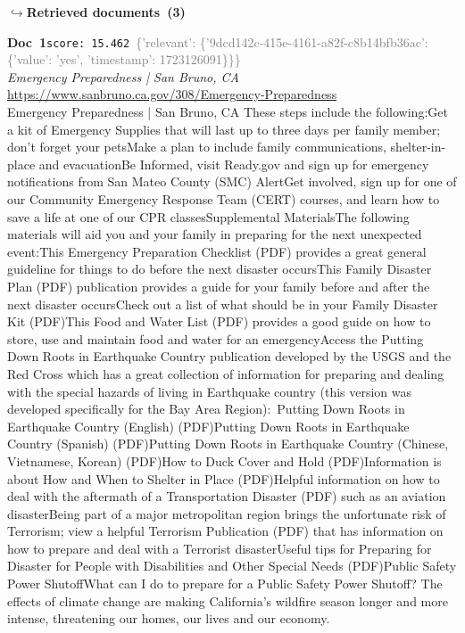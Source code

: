 \documentclass[a4paper,11pt]{article}
\begin{document}
\noindent\hfill{\footnotesize\textcolor{doccolor}{\textbf{$\hookrightarrow$\enspace Retrieved documents~(3)}}}
\begin{docenv}
{\footnotesize\textcolor{doccolor}{\textbf{Doc~1}}}\hfill{\tiny\texttt{score:~15.462}}\ {\tiny\textcolor{gray}{\{'relevant': \{'9dcd142c-415e-4161-a82f-c8b14bfb36ac': \{'value': 'yes', 'timestamp': 1723126091\}\}\}}}\\[3pt]
{\small\textit{Emergency Preparedness | San Bruno, CA}}\\[2pt]
{\tiny\url{https://www.sanbruno.ca.gov/308/Emergency-Preparedness}}\\[4pt]
{\footnotesize Emergency Preparedness | San Bruno, CA
These steps include the following:Get a kit of Emergency Supplies that will last up to three days per family member; don't forget your petsMake a plan to include family communications, shelter-in-place and evacuationBe Informed, visit Ready.gov and sign up for emergency notifications from San Mateo County (SMC) AlertGet involved, sign up for one of our Community Emergency Response Team (CERT) courses, and learn how to save a life at one of our CPR classesSupplemental MaterialsThe following materials will aid you and your family in preparing for the next unexpected event:This Emergency Preparation Checklist (PDF) provides a great general guideline for things to do before the next disaster occursThis Family Disaster Plan (PDF) publication provides a guide for your family before and after the next disaster occursCheck out a list of what should be in your Family Disaster Kit (PDF)This Food and Water List (PDF) provides a good guide on how to store, use and maintain food and water for an emergencyAccess the Putting Down Roots in Earthquake Country publication developed by the USGS and the Red Cross which has a great collection of information for preparing and dealing with the special hazards of living in Earthquake country (this version was developed specifically for the Bay Area Region): Putting Down Roots in Earthquake Country (English) (PDF)Putting Down Roots in Earthquake Country (Spanish) (PDF)Putting Down Roots in Earthquake Country (Chinese, Vietnamese, Korean) (PDF)How to Duck Cover and Hold (PDF)Information is about How and When to Shelter in Place (PDF)Helpful information on how to deal with the aftermath of a Transportation Disaster (PDF) such as an aviation disasterBeing part of a major metropolitan region brings the unfortunate risk of Terrorism; view a helpful Terrorism Publication (PDF) that has information on how to prepare and deal with a Terrorist disasterUseful tips for Preparing for Disaster for People with Disabilities and Other Special Needs (PDF)Public Safety Power ShutoffWhat can I do to prepare for a Public Safety Power Shutoff? The effects of climate change are making California's wildfire season longer and more intense, threatening our homes, our lives and our economy.}
\end{docenv}
\end{document}
